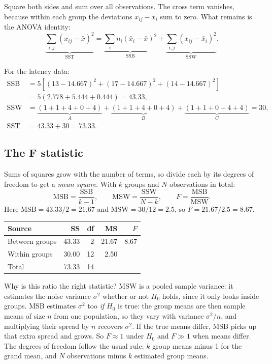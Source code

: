 Square both sides and sum over all observations. The cross term vanishes,
because within each group the deviations $x_{ij} - \bar x_i$ sum to zero. What
remains is the ANOVA identity:
\[
  \underbrace{\sum_{i,j}(x_{ij}-\bar x)^2}_{\text{SST}}
  = \underbrace{\sum_{i} n_i(\bar x_i - \bar x)^2}_{\text{SSB}}
  + \underbrace{\sum_{i,j}(x_{ij}-\bar x_i)^2}_{\text{SSW}}.
\]

For the latency data:
\begin{align*}
  \text{SSB} &= 5\left[(13-14.667)^2 + (17-14.667)^2 + (14-14.667)^2\right] \\
             &= 5(2.778 + 5.444 + 0.444) = 43.33,\\
  \text{SSW} &= \underbrace{(1+1+4+0+4)}_{A} + \underbrace{(1+1+4+0+4)}_{B}
             + \underbrace{(1+1+0+4+4)}_{C} = 30,\\
  \text{SST} &= 43.33 + 30 = 73.33.
\end{align*}

\subsection{The F statistic}

Sums of squares grow with the number of terms, so divide each by its degrees of
freedom to get a \emph{mean square}. With $k$ groups and $N$ observations in
total:
\[
  \text{MSB} = \frac{\text{SSB}}{k-1}, \qquad
  \text{MSW} = \frac{\text{SSW}}{N-k}, \qquad
  F = \frac{\text{MSB}}{\text{MSW}}.
\]
Here $\text{MSB} = 43.33/2 = 21.67$ and $\text{MSW} = 30/12 = 2.5$, so
$F = 21.67 / 2.5 = 8.67$.

\begin{center}
\begin{tabular}{lrrrr}
\toprule
Source & SS & df & MS & $F$ \\
\midrule
Between groups & 43.33 & 2 & 21.67 & 8.67 \\
Within groups & 30.00 & 12 & 2.50 & \\
\midrule
Total & 73.33 & 14 & & \\
\bottomrule
\end{tabular}
\end{center}

\begin{whybox}
Why is this ratio the right statistic? MSW is a pooled sample variance: it
estimates the noise variance $\sigma^2$ whether or not $H_0$ holds, since it
only looks inside groups. MSB estimates $\sigma^2$ too \emph{if} $H_0$ is true:
the group means are then sample means of size $n$ from one population, so they
vary with variance $\sigma^2/n$, and multiplying their spread by $n$ recovers
$\sigma^2$. If the true means differ, MSB picks up that extra spread and grows.
So $F \approx 1$ under $H_0$ and $F \gg 1$ when means differ. The degrees of
freedom follow the usual rule: $k$ group means minus 1 for the grand mean, and
$N$ observations minus $k$ estimated group means.
\end{whybox}

